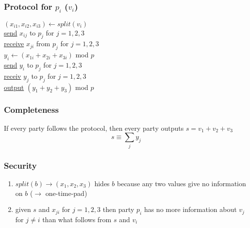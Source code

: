 \documentclass{report}
\begin{document}
\begin{adjustwidth}{2em}{2em}
\begin{adjustwidth}{2em}{2em}
 		\subsubsection{Protocol for $p_i$ ($v_i$)}
 		\begin{adjustwidth}{2em}{}
 			$(x_{i1}, x_{i2}, x_{i3}) \leftarrow split(v_i)$ \\
 			\underline{send} $x_{ij}$ to $p_j$ for $j = 1,2,3$ \\
 			\underline{receive} $x_{ji}$ from $p_j$ for $j = 1,2,3$ \\
 			$y_i \leftarrow (x_{1i} + x_{2i} + x_{3i})$ mod $p$ \\
 			\underline{send} $y_i$ to $p_j$ for $j = 1,2,3$ \\
 			\underline{receiv} $y_j$ to $p_j$ for $j = 1,2,3$ \\
 			\underline{output} $(y_1 + y_2 + y_3)$ mod $p$
 		\end{adjustwidth}
 		\subsubsection{Completeness}
 		\begin{adjustwidth}{2em}{}
 			If every party follows the protocol, then every party outputs $s = v_1 + v_2 + v_3$
 			\[
 				s \equiv \sum_j y_j
 			\]
 		\end{adjustwidth}
 		\subsubsection{Security}
 		\begin{adjustwidth}{2em}{}
 			\begin{enumerate}
 				\item $split(b) \rightarrow (x_1, x_2, x_3)$ hides $b$ because any two values give no information on $b$ ($\rightarrow$ one-time-pad)
 				\item given $s$ and $x_{ji}$ for $j = 1,2,3$ then party $p_i$ has no more information about $v_j$ for $j \neq i$ than what follows from $s$ and $v_i$
 			\end{enumerate} 			
 		\end{adjustwidth}
 	\end{adjustwidth}
 \end{adjustwidth}
 
\end{document}
